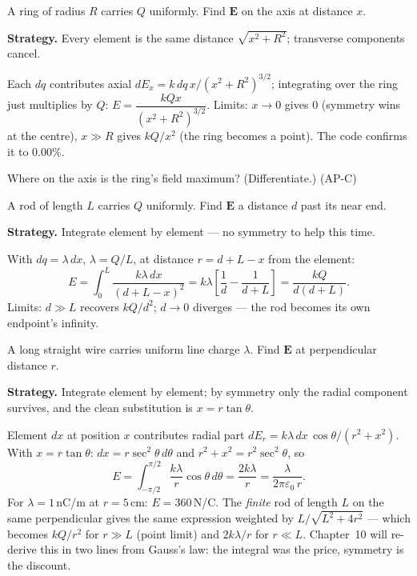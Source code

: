 \begin{example}\label{ex:ring}
A ring of radius $R$ carries $Q$ uniformly. Find $\mathbf E$ on the
axis at distance $x$.
\par\smallskip
\textbf{Strategy.} Every element is the same distance
$\sqrt{x^{2}+R^{2}}$; transverse components cancel.
\begin{solution}
Each $dq$ contributes axial
$dE_x=k\,dq\,x/(x^{2}+R^{2})^{3/2}$; integrating over the ring just
multiplies by $Q$:
$E=\dfrac{kQx}{(x^{2}+R^{2})^{3/2}}$.
Limits: $x\to0$ gives $0$ (symmetry wins at the centre), $x\gg R$ gives
$kQ/x^{2}$ (the ring becomes a point). The code confirms it to $0.00\%$.
\checkmark
\end{solution}
\end{example}

\begin{exercise}[easy]
Where on the axis is the ring's field maximum? (Differentiate.) (AP-C)
\end{exercise}

\begin{example}\label{ex:rod}
A rod of length $L$ carries $Q$ uniformly. Find $\mathbf E$ a distance
$d$ past its near end.
\par\smallskip
\textbf{Strategy.} Integrate element by element --- no symmetry to
help this time.
\begin{solution}
With $dq=\lambda\,dx$, $\lambda=Q/L$, at distance $r=d+L-x$ from the
element:
\[E=\int_0^{L}\frac{k\lambda\,dx}{(d+L-x)^{2}}
=k\lambda\left[\frac{1}{d}-\frac{1}{d+L}\right]
=\frac{kQ}{d(d+L)}.\]
Limits: $d\gg L$ recovers $kQ/d^{2}$; $d\to0$ diverges --- the rod
becomes its own endpoint's infinity. \checkmark
\end{solution}
\end{example}

\begin{example}\label{ex:line}
A long straight wire carries uniform line charge $\lambda$. Find
$\mathbf E$ at perpendicular distance $r$.
\par\smallskip
\textbf{Strategy.} Integrate element by element; by symmetry only the
radial component survives, and the clean substitution is
$x=r\tan\theta$.
\begin{solution}
Element $dx$ at position $x$ contributes radial part
$dE_r=k\lambda\,dx\,\cos\theta/(r^{2}+x^{2})$. With
$x=r\tan\theta$: $dx=r\sec^{2}\theta\,d\theta$ and
$r^{2}+x^{2}=r^{2}\sec^{2}\theta$, so
\[E=\int_{-\pi/2}^{\pi/2}\frac{k\lambda}{r}\cos\theta\,d\theta
=\frac{2k\lambda}{r}=\frac{\lambda}{2\pi\varepsilon_0\,r}.\]
For $\lambda=1$\,nC/m at $r=5$\,cm: $E=360$\,N/C.
The \emph{finite} rod of length $L$ on the same perpendicular gives the
same expression weighted by $L/\sqrt{L^{2}+4r^{2}}$ --- which becomes
$kQ/r^{2}$ for $r\gg L$ (point limit) and $2k\lambda/r$ for
$r\ll L$. Chapter~10 will re-derive this in two lines from Gauss's law:
the integral was the price, symmetry is the discount. \checkmark
\end{solution}
\end{example}


